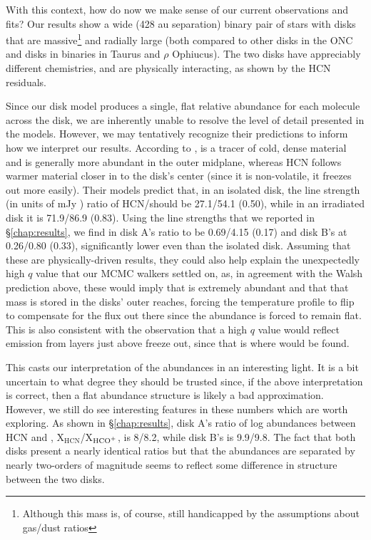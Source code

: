 With this context, how do now we make sense of our current observations and fits? Our results show a wide (428 au separation) binary pair of stars with disks that are massive\footnote{Although this mass is, of course, still handicapped by the assumptions about gas/dust ratios} and radially large (both compared to other disks in the ONC and disks in binaries in Taurus and $\rho$ Ophiucus). The two disks have appreciably different chemistries, and are physically interacting, as shown by the HCN residuals.


Since our disk model produces a single, flat relative abundance for each molecule across the disk, we are inherently unable to resolve the level of detail presented in the models. However, we may tentatively recognize their predictions to inform how we interpret our results. According to \citet{Walsh2013}, \hco is a tracer of cold, dense material and is generally more abundant in the outer midplane, whereas HCN follows warmer material closer in to the disk's center (since it is non-volatile, it freezes out more easily). Their models predict that, in an isolated disk, the line strength (in units of mJy \kms) ratio of HCN/\hco should be 27.1/54.1 (0.50), while in an irradiated disk it is 71.9/86.9 (0.83). Using the line strengths that we reported in \S\ref{chap:results}, we find in disk A's ratio to be 0.69/4.15 (0.17) and disk B's at 0.26/0.80 (0.33), significantly lower even than the isolated disk. Assuming that these are physically-driven results, they could also help explain the unexpectedly high $q$ value that our MCMC walkers settled on, as, in agreement with the Walsh prediction above, these would imply that \hco is extremely abundant and that that mass is stored in the disks' outer reaches, forcing the temperature profile to flip to compensate for the flux out there since the abundance is forced to remain flat. This is also consistent with the \citet{Schwarz2016} observation that a high $q$ value would reflect emission from layers just above freeze out, since that is where \hco would be found.


This casts our interpretation of the abundances in an interesting light. It is a bit uncertain to what degree they should be trusted since, if the above interpretation is correct, then a flat abundance structure is likely a bad approximation. However, we still do see interesting features in these numbers which are worth exploring. As shown in \S\ref{chap:results}, disk A's ratio of log abundances between HCN and \hco, X$_\text{HCN}$/X$_\text{HCO$^+$}$, is 8/8.2, while disk B's is 9.9/9.8. The fact that both disks present a nearly identical ratios but that the abundances are separated by nearly two-orders of magnitude seems to reflect some difference in structure between the two disks.

